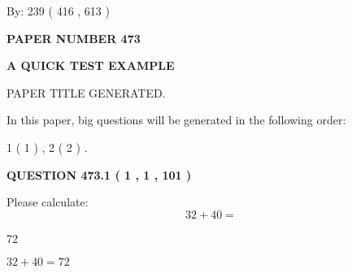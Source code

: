 \documentclass[12pt]{article}
\begin{document}
   
\hspace{1.0in} By: 
 239 ( 416 ,  613 )
   
   
   
   
\newpage 
\setcounter{page}{ 
   473001 } 
   
   
   
   
 {\textbf{ \Large{ PAPER NUMBER  473  }}}
   
   
\vspace{0.2in}
   
   
   
   
   
   
   
   
 \vspace{0.2in}
{\LARGE {\textbf{ A QUICK TEST EXAMPLE}}}
   
   
 PAPER TITLE GENERATED.
   
   
   
\vspace{0.2in}
   
In this paper, big questions will be generated in the following order: 
   
   
   1 ( 1 )
 ,
   2 ( 2 )
 .
  
\vspace{0.2in}
  
{\textbf{\Large{QUESTION
473.1 
 ( 1 , 1 , 101 )
}}}
  
  
 
Please calculate:
\begin{equation}
32 +  %
40 = \nonumber
\end{equation}
 
 
 
\noindent{}
 
 

72
 
 
\noindent{}
 
 

 
 
 
\noindent{}
 
 

$ %
32 +  %
40=   %
72$
 
 
\noindent{}
 
\end{document}
